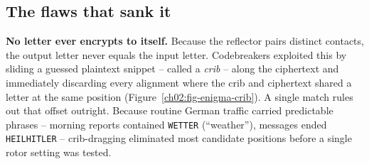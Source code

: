 \subsection{The flaws that sank it}
\label{ch02:enigma-flaws}

\begin{attackbox}
\textbf{No letter ever encrypts to itself.} Because the reflector pairs distinct contacts, the
output letter never equals the input letter. Codebreakers exploited this by sliding a guessed
plaintext snippet -- called a \emph{crib} -- along the ciphertext and immediately discarding
every alignment where the crib and ciphertext shared a letter at the same position
(Figure~\ref{ch02:fig-enigma-crib}). A single match rules out that offset outright. Because
routine German traffic carried predictable phrases -- morning reports contained \texttt{WETTER}
(``weather''), messages ended \texttt{HEILHITLER} -- crib-dragging eliminated most candidate
positions before a single rotor setting was tested.
\end{attackbox}

